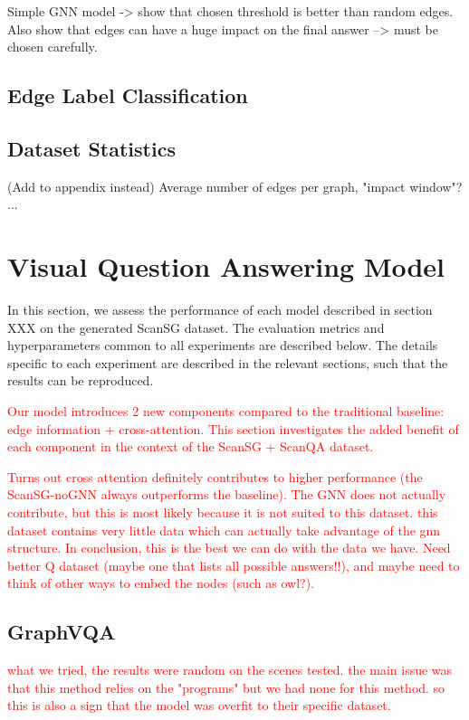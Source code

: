 Simple GNN model -> show that chosen threshold is better than random edges.
Also show that edges can have a huge impact on the final answer --> must be chosen carefully.



\subsection{Edge Label Classification}

\subsection{Dataset Statistics}
(Add to appendix instead)
Average number of edges per graph, "impact window"? ...



\section{Visual Question Answering Model}

In this section, we assess the performance of each model described in section XXX on the generated ScanSG dataset. The evaluation metrics and hyperparameters common to all experiments are described below. The details specific to each experiment are described in the relevant sections, such that the results can be reproduced.

\textcolor{red}{
Our model introduces 2 new components compared to the traditional baseline: edge information + cross-attention. This section investigates the added benefit of each component in the context of the ScanSG + ScanQA dataset.}

\textcolor{red}{
Turns out cross attention definitely contributes to higher performance (the ScanSG-noGNN always outperforms the baseline). The GNN does not actually contribute, but this is most likely because it is not suited to this dataset. this dataset contains very little data which can actually take advantage of the gnn structure. In conclusion, this is the best we can do with the data we have. Need better Q dataset (maybe one that lists all possible answers!!), and maybe need to think of other ways to embed the nodes (such as owl?).
}

\subsection{GraphVQA}
\textcolor{red}{
what we tried, the results were random on the scenes tested.
the main issue was that this method relies on the "programs" but we had none for this method.
so this is also a sign that the model was overfit to their specific dataset.}

